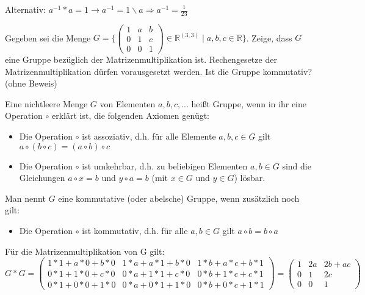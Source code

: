 \documentclass[10pt, a4paper]{exam}
\begin{document}
\begin{questions}
\begin{parts}
\begin{solution}
      Alternativ: $a^{-1}*a=1 \rightarrow a^{-1}=1\backslash a \Rightarrow a^{-1}=\frac{1}{23}$


    \end{solution}
  \end{parts}

  \question Gegeben sei die Menge $G=\{ \begin{pmatrix} 1&a&b\\0&1&c\\0&0&1 \end{pmatrix} \in\mathbb{R}^{(3,3)}\mid a,b,c\in\mathbb{R}\}$. Zeige, dass $G$ eine Gruppe bezüglich der Matrizenmultiplikation ist. Rechengesetze der Matrizenmultiplikation dürfen vorausgesetzt werden. Ist die Gruppe kommutativ? (ohne Beweis)
  \begin{solution}

    Eine nichtleere Menge $G$ von Elementen $a, b, c, ...$ heißt Gruppe, wenn in ihr eine Operation $\circ$ erklärt ist, die folgenden Axiomen genügt:
    \begin{itemize}
      \item Die Operation $\circ$ ist assoziativ, d.h. für alle Elemente $a,b,c\in G$ gilt $a\circ (b\circ c)=(a\circ b)\circ c$
      \item Die Operation $\circ$ ist umkehrbar, d.h. zu beliebigen Elementen $a,b\in G$ sind die Gleichungen $a\circ x=b$ und $y\circ a=b$ (mit $x\in G$ und $y\in G$) lösbar.
    \end{itemize}
    Man nennt $G$ eine kommutative (oder abelsche) Gruppe, wenn zusätzlich noch gilt:
    \begin{itemize}
      \item Die Operation $\circ$ ist kommutativ, d.h. für alle $a,b\in G$ gilt $a\circ b=b\circ a$
    \end{itemize}

    Für die Matrizenmultiplikation von G gilt: 
    $G*G=\begin{pmatrix} 
      1*1+a*0+b*0 & 1*a+a*1+b*0 & 1*b+a*c+b*1 \\ 
      0*1+1*0+c*0 & 0*a+1*1+c*0 & 0*b+1*c+c*1 \\ 
      0*1+0*0+1*0 & 0*a+0*1+1*0 & 0*b+0*c+1*1
    \end{pmatrix} = \begin{pmatrix}
      1 & 2a & 2b+ac\\ 
      0 & 1 & 2c\\
      0 & 0 & 1  
    \end{pmatrix}$


\end{solution}
\end{questions}
\end{document}
